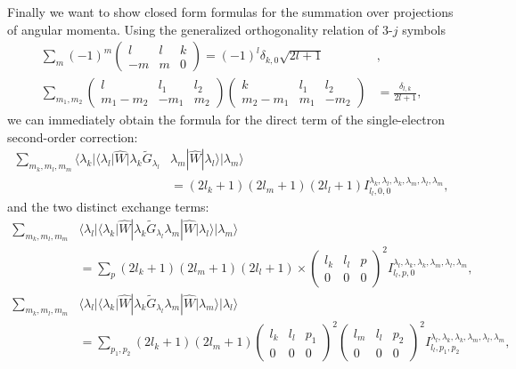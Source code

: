 Finally we want to show closed form formulas for the summation over projections of angular momenta. Using the generalized orthogonality relation of 3-$j$ symbols~\cite{cowan1981theory}
\begin{align} \label{3jProps2}
    \sum_m (-1)^m\begin{pmatrix} l & l & k \\ -m & m & 0\end{pmatrix} = (-1)^l\delta_{k,0}\sqrt{2l+1}&, \\
    \sum_{m_1,m_2}
    \begin{pmatrix} l & l_1 & l_2 \\ m_1-m_2 & -m_1 & m_2 \end{pmatrix}
    \begin{pmatrix} k & l_1 & l_2 \\ m_2-m_1 & m_1 & -m_2 \end{pmatrix}
    &= \frac{\delta_{l,k}}{2l+1},
\end{align}
we can immediately obtain the formula for the direct term of the single-electron second-order correction:
\begin{align}
    \sum_{m_k,m_l,m_m}\langle \lambda_k |\langle\lambda_l|\widehat{W} |\lambda_k \widetilde{G}_{\lambda_l} &\lambda_m|\widehat{W}|\lambda_l \rangle |\lambda_m \rangle \nonumber \\
    &= (2l_k+1)(2l_m+1)(2l_l+1)I^{\lambda_k,\lambda_l,\lambda_k,\lambda_m,\lambda_l,\lambda_m}_{l_l,0,0},
\end{align}
and the two distinct exchange terms:
\begin{align}
    \sum_{m_k,m_l,m_m}&\langle \lambda_l |\langle\lambda_k|\widehat{W} |\lambda_k \widetilde{G}_{\lambda_l} \lambda_m|\widehat{W}|\lambda_l \rangle |\lambda_m \rangle \nonumber
    \\
    &=\sum_p(2l_k+1)(2l_m+1)(2l_l+1)
    \times\begin{pmatrix} l_k & l_l & p \\ 0 & 0 & 0 \end{pmatrix}^2I^{\lambda_l,\lambda_k,\lambda_k,\lambda_m,\lambda_l,\lambda_m}_{l_l,p,0},
\end{align}
\begin{align}
    \sum_{m_k,m_l,m_m}&\langle \lambda_l |\langle\lambda_k|\widehat{W} |\lambda_k \widetilde{G}_{\lambda_l} \lambda_m|\widehat{W}|\lambda_m \rangle |\lambda_l \rangle \nonumber 
    \\
    &= \sum_{p_1,p_2}(2l_k+1)(2l_m+1)\begin{pmatrix} l_k & l_l & p_1 \\ 0 & 0 & 0 \end{pmatrix}^2\begin{pmatrix} l_m & l_l & p_2 \\ 0 & 0 & 0 \end{pmatrix}^2I^{\lambda_l,\lambda_k,\lambda_k,\lambda_m,\lambda_l,\lambda_m}_{l_l,p_1,p_2},
\end{align}
